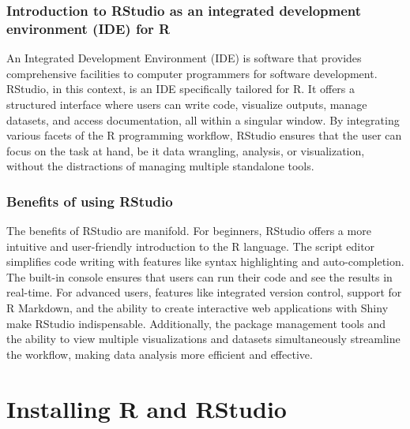 \documentclass[
  b5paper]{book}
\begin{document}
\hypertarget{introduction-to-rstudio-as-an-integrated-development-environment-ide-for-r}{%
\subsubsection*{Introduction to RStudio as an integrated development environment (IDE) for R}\label{introduction-to-rstudio-as-an-integrated-development-environment-ide-for-r}}

An Integrated Development Environment (IDE) is software that provides comprehensive facilities to computer programmers for software development. RStudio, in this context, is an IDE specifically tailored for R. It offers a structured interface where users can write code, visualize outputs, manage datasets, and access documentation, all within a singular window. By integrating various facets of the R programming workflow, RStudio ensures that the user can focus on the task at hand, be it data wrangling, analysis, or visualization, without the distractions of managing multiple standalone tools.

\hypertarget{benefits-of-using-rstudio}{%
\subsubsection*{Benefits of using RStudio}\label{benefits-of-using-rstudio}}

The benefits of RStudio are manifold. For beginners, RStudio offers a more intuitive and user-friendly introduction to the R language. The script editor simplifies code writing with features like syntax highlighting and auto-completion. The built-in console ensures that users can run their code and see the results in real-time. For advanced users, features like integrated version control, support for R Markdown, and the ability to create interactive web applications with Shiny make RStudio indispensable. Additionally, the package management tools and the ability to view multiple visualizations and datasets simultaneously streamline the workflow, making data analysis more efficient and effective.

\hypertarget{installing-r-and-rstudio}{%
\section{Installing R and RStudio}\label{installing-r-and-rstudio}}
\end{document}
